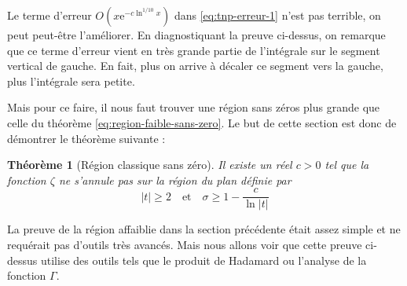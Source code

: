 \documentclass[french]{report}
\newtheorem{theorem}{Théorème}[section]
\begin{document}
Le terme d'erreur $O(x\mathrm{e}^{-c\ln^{1/10}x})$ dans \ref{eq:tnp-erreur-1} n'est pas terrible, on peut peut-être l'améliorer. En diagnostiquant la preuve ci-dessus, on remarque que ce terme d'erreur vient en très grande partie de l'intégrale sur le segment vertical de gauche. En fait, plus on arrive à décaler ce segment vers la gauche, plus l'intégrale sera petite.

Mais pour ce faire, il nous faut trouver une région sans zéros plus grande que celle du théorème \ref{eq:region-faible-sans-zero}. Le but de cette section est donc de démontrer le théorème suivante :

\begin{theorem}[Région classique sans zéro]\label{thm:region-classique-sans-zero}
  Il existe un réel $c>0$ tel que la fonction $\zeta$ ne s'annule pas sur la région du plan définie par
  \[ |t|\geq2 \quad \mathrm{et} \quad \sigma\geq1-\frac{c}{\ln|t|} \]
\end{theorem}

La preuve de la région affaiblie dans la section précédente était assez simple et ne requérait pas d'outils très avancés. Mais nous allons voir que cette preuve ci-dessus utilise des outils tels que le produit de Hadamard ou l'analyse de la fonction $\Gamma$.
\end{document}
